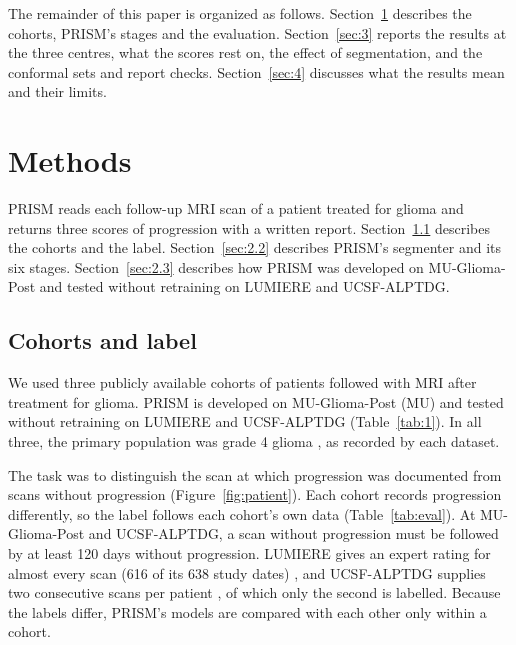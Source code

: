 \documentclass[largeformat]{interact} %
\begin{document}
The remainder of this paper is organized as follows. Section~\ref{sec:2} describes the cohorts, PRISM's stages and the
evaluation. Section~\ref{sec:3} reports the results at the three centres, what the scores rest on, the effect of
segmentation, and the conformal sets and report checks. Section~\ref{sec:4} discusses what the results mean and their
limits.
\section{Methods}\label{sec:2}

PRISM reads each follow-up MRI scan of a patient treated for glioma and returns three scores of progression with a
written report. Section~\ref{sec:2.1} describes the cohorts and the label. Section~\ref{sec:2.2} describes PRISM's
segmenter and its six stages. Section~\ref{sec:2.3} describes how PRISM was developed on MU-Glioma-Post and tested
without retraining on LUMIERE and UCSF-ALPTDG.

\subsection{Cohorts and label}\label{sec:2.1}

We used three publicly available cohorts of patients followed with MRI after treatment for glioma. PRISM is developed on
MU-Glioma-Post (MU) \citep{mahmoud2025,yaseen2025tcia} and tested without retraining on LUMIERE \citep{suter2022} and UCSF-ALPTDG
\citep{fields2024} (Table~\ref{tab:1}). In all three, the primary population was grade 4 glioma \citep{louis2021}, as
recorded by each dataset.

The task was to distinguish the scan at which progression was documented from scans without progression
(Figure~\ref{fig:patient}). Each cohort
records progression differently, so the label follows each cohort's own data (Table~\ref{tab:eval}). At
MU-Glioma-Post and UCSF-ALPTDG, a scan without progression must be followed by at least 120 days without progression.
LUMIERE gives an expert rating for almost every scan (616 of its 638 study dates)
\citep{suter2022}, and UCSF-ALPTDG supplies two consecutive scans per patient \citep{fields2024}, of which only the second is
labelled. Because the labels differ, PRISM's models are compared with each other only within a cohort.
\end{document}
